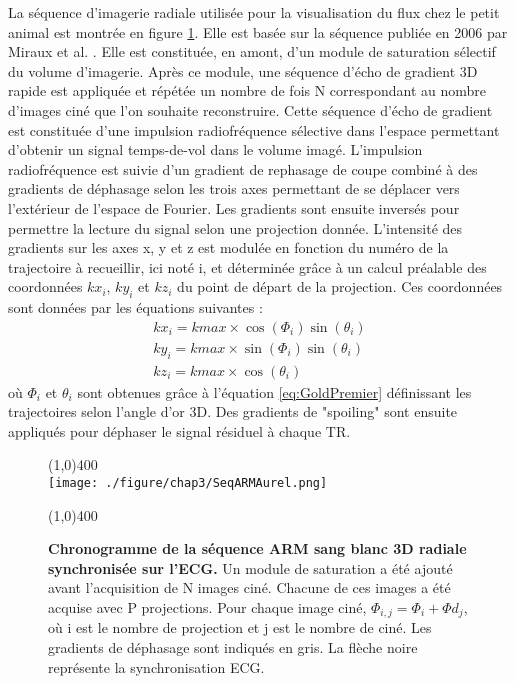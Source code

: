 La séquence d’imagerie radiale utilisée pour la visualisation du flux chez le petit animal est montrée en figure \ref{fig:SeqARMAurel}. Elle est basée sur la séquence publiée en 2006 par Miraux et al. \cite{Miraux:2006fu}. Elle est constituée, en amont, d'un module de saturation sélectif du volume d'imagerie. Après ce module, une séquence d'écho de gradient 3D rapide est appliquée et répétée un nombre de fois N correspondant au nombre d'images ciné que l'on souhaite reconstruire. Cette séquence d'écho de gradient est constituée d'une impulsion radiofréquence sélective dans l'espace permettant d'obtenir un signal temps-de-vol dans le volume imagé. L'impulsion radiofréquence est suivie d'un gradient de rephasage de coupe combiné à des gradients de déphasage selon les trois axes permettant de se déplacer vers l'extérieur de l'espace de Fourier. Les gradients sont ensuite inversés pour permettre la lecture du signal selon une projection donnée. 
L'intensité des gradients sur les axes x, y et z est modulée en fonction du numéro de la trajectoire à recueillir, ici noté i, et déterminée grâce à un calcul préalable des coordonnées $kx_i$, $ky_i$ et $kz_i$ du point de départ de la projection. Ces coordonnées sont données par les équations suivantes :
\begin{equation}
\label{eq:GoldSecond}
\begin{array}{c}
kx_i = kmax \times \cos(\Phi_i) \sin(\theta_i) \\
ky_i = kmax \times \sin(\Phi_i) \sin(\theta_i) \\
kz_i = kmax \times \cos(\theta_i)
\end{array}
\end{equation}
où $\Phi_i$ et $\theta_i$ sont obtenues grâce à l'équation \ref{eq:GoldPremier} définissant les trajectoires selon l'angle d'or 3D. Des gradients de "spoiling" sont ensuite appliqués pour déphaser le signal résiduel à chaque TR.

\begin{figure}[H]
\centering \line(1,0){400} \\
\texttt{[image: ./figure/chap3/SeqARMAurel.png]}
\caption[Chronogramme de la séquence ARM sang blanc 3D+t radiale synchronisée sur l'ECG.]{\label{fig:SeqARMAurel}\textbf{ Chronogramme de la séquence ARM sang blanc 3D radiale synchronisée sur l'ECG.} Un module de saturation a été ajouté avant l'acquisition de N images ciné. Chacune de ces images a été acquise avec P projections. Pour chaque image ciné, $\Phi_{i,j} = \Phi_i+\Phi d_j$, où i est le nombre de projection et j est le nombre de ciné. Les gradients de déphasage sont indiqués en gris. La flèche noire représente la synchronisation ECG.}
\line(1,0){400} \\ \end{figure}

